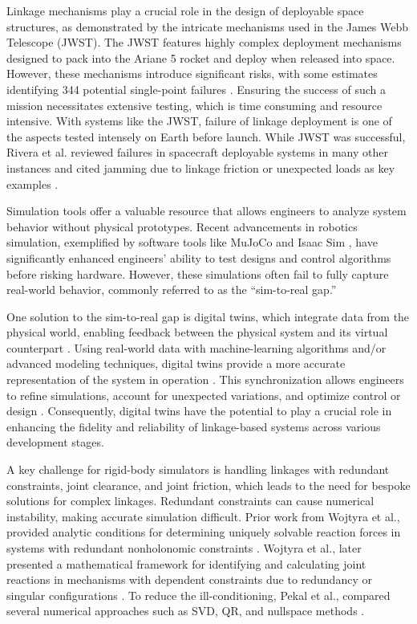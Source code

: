 Linkage mechanisms play a crucial role in the design of deployable space structures, as demonstrated by the intricate mechanisms used in the James Webb Telescope (JWST). The JWST features highly complex deployment mechanisms designed to pack into the Ariane 5 rocket and deploy when released into space. However, these mechanisms introduce significant risks, with some estimates identifying 344 potential single-point failures \cite{menzel_lessons_2024}. Ensuring the success of such a mission necessitates extensive testing, which is time consuming and resource intensive. With systems like the JWST, failure of linkage deployment is one of the aspects tested intensely on Earth before launch. While JWST was successful, Rivera et al. reviewed failures in spacecraft deployable systems in many other instances and cited jamming due to linkage friction or unexpected loads as key examples \cite{rivera_study_2021}. 

Simulation tools offer a valuable resource that allows engineers to analyze system behavior without physical prototypes. Recent advancements in robotics simulation, exemplified by software tools like MuJoCo \cite{todorov_mujoco_2012} and Isaac Sim \cite{mittal_orbit_2023}, have significantly enhanced engineers’ ability to test designs and control algorithms before risking hardware. However, these simulations often fail to fully capture real-world behavior, commonly referred to as the ``sim-to-real gap.''

One solution to the sim-to-real gap is digital twins, which integrate data from the physical world, enabling feedback between the physical system and its virtual counterpart \cite{tao_digital_2019}. Using real-world data with machine-learning algorithms and/or advanced modeling techniques, digital twins provide a more accurate representation of the system in operation \cite{phanden_review_2021}. This synchronization allows engineers to refine simulations, account for unexpected variations, and optimize control or design \cite{ritto_digital_2021, kapteyn_data-driven_2022}. Consequently, digital twins have the potential to play a crucial role in enhancing the fidelity and reliability of linkage-based systems across various development stages.

A key challenge for rigid-body simulators is handling linkages with redundant constraints, joint clearance, and joint friction, which leads to the need for bespoke solutions for complex linkages. Redundant constraints can cause numerical instability, making accurate simulation difficult. Prior work from Wojtyra et al.,  provided analytic conditions for determining uniquely solvable reaction forces in systems with redundant nonholonomic constraints \cite{wojtyra_joint_2009}. Wojtyra et al., later presented a mathematical framework for identifying and calculating joint reactions in mechanisms with dependent constraints due to redundancy or singular configurations \cite{wojtyra_solvability_2013}. To reduce the ill-conditioning, Pekal et al., compared several numerical approaches such as SVD, QR, and nullspace methods \cite{pekal_constraint-matrix-based_2023}. 

